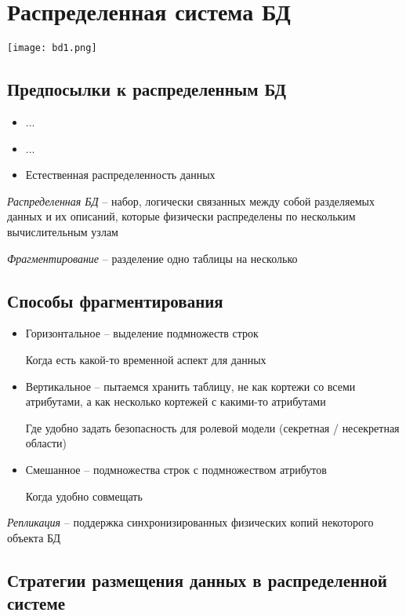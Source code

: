 \documentclass[12pt, a4paper]{article}
\begin{document}
\section{Распределенная система БД}

\texttt{[image: bd1.png]}

\subsection{Предпосылки к распределенным БД}

\begin{itemize}
    \item ...
    \item ...
    \item Естественная распределенность данных
\end{itemize}

\emph{Распределенная БД} -- набор, логически связанных между собой разделяемых данных и их описаний, которые физически распределены по нескольким вычислительным узлам


\emph{Фрагментирование} -- разделение одно таблицы на несколько

\subsection{Способы фрагментирования}
\begin{itemize}
    \item Горизонтальное -- выделение подмножеств строк
    
    Когда есть какой-то временной аспект для данных
    
    \item Вертикальное -- пытаемся хранить таблицу, не как кортежи со всеми атрибутами, а как несколько кортежей с какими-то атрибутами
    
    Где удобно задать безопасность для ролевой модели (секретная / несекретная области)
    
    \item Смешанное -- подмножества строк с подмножеством атрибутов
    
    Когда удобно совмещать 
    
\end{itemize}

\emph{Репликация} -- поддержка синхронизированных физических копий некоторого объекта БД

\subsection{Стратегии размещения данных в распределенной системе}
\end{document}
